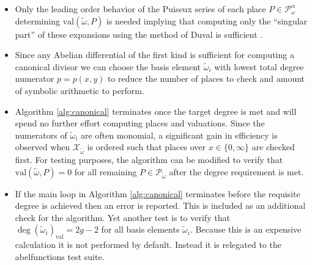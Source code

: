 \begin{itemize}
\item Only the leading order behavior of the Puiseux series of each place $P \in
  \mathcal{P}_\omega^\alpha$ determining $\text{val}(\tilde{\omega},P)$ is
  needed implying that computing only the ``singular part'' of these expansions
  using the method of Duval is sufficient \cite{Duval89}.
\item Since any Abelian differential of the first kind is sufficient for
  computing a canonical divisor we can choose the basis element
  $\tilde{\omega}_i$ with lowest total degree numerator $p=p(x,y)$ to reduce the
  number of places to check and amount of symbolic arithmetic to perform.
\item Algorithm \ref{alg:canonical} terminates once the target degree is met and
  will spend no further effort computing places and valuations. Since the
  numerators of $\tilde{\omega}_i$ are often monomial, a significant gain in
  efficiency is observed when $\mathcal{X}_{\tilde{\omega}}$ is ordered such
  that places over $x \in \{0,\infty\}$ are checked first. For testing purposes,
  the algorithm can be modified to verify that $\text{val}(\tilde{\omega},P) =
  0$ for all remaining $P \in \mathcal{P}_{\tilde{\omega}}$ after the degree
  requirement is met.
\item If the main loop in Algorithm \ref{alg:canonical} terminates before the
  requisite degree is achieved then an error is reported. This is included as an
  additional check for the algorithm. Yet another test is to verify that $\deg
  (\tilde{\omega}_i)_\text{val} = 2g-2$ for all basis elements
  $\tilde{\omega}_i$. Because this is an expensive calculation it is not
  performed by default. Instead it is relegated to the {\sc abelfunctions} test
  suite.
\end{itemize}

